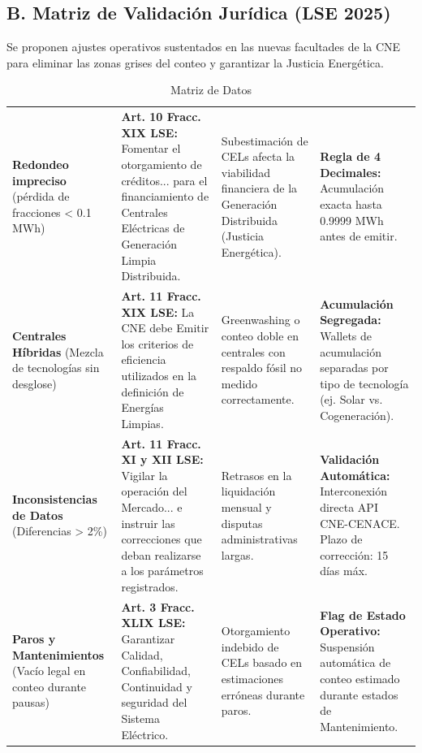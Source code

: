 \documentclass{cel}
\begin{document}
\subsection{B. Matriz de Validación Jurídica (LSE 2025)}
\nopagebreak

Se proponen ajustes operativos sustentados en las nuevas facultades de la CNE para eliminar las \textquotedbl{}zonas grises\textquotedbl{} del conteo y garantizar la Justicia Energética.


\vspace{0.3cm}
\begin{tabladoradoLargo}
\renewcommand{\tabularxcolumn}[1]{p{#1}}
\begin{xltabular}{\textwidth}{|X|X|X|X|}
\caption{Matriz de Datos} \\
\toprule
{}  &  &  &  \\
\midrule
\endhead
\textbf{Redondeo impreciso} (pérdida de fracciones \textless{} 0.1 MWh) & \textbf{Art. 10 Fracc. XIX LSE:} \textquotedbl{}Fomentar el otorgamiento de créditos... para el financiamiento de Centrales Eléctricas de Generación Limpia Distribuida\textquotedbl{}. & Subestimación de CELs afecta la viabilidad financiera de la Generación Distribuida (Justicia Energética). & \textbf{Regla de 4 Decimales:} Acumulación exacta hasta 0.9999 MWh antes de emitir. \\ \hline
\textbf{Centrales Híbridas} (Mezcla de tecnologías sin desglose) & \textbf{Art. 11 Fracc. XIX LSE:} La CNE debe \textquotedbl{}Emitir los criterios de eficiencia utilizados en la definición de Energías Limpias\textquotedbl{}. & \textquotedbl{}Greenwashing\textquotedbl{} o conteo doble en centrales con respaldo fósil no medido correctamente. & \textbf{Acumulación Segregada:} \textquotedbl{}Wallets\textquotedbl{} de acumulación separadas por tipo de tecnología (ej. Solar vs. Cogeneración). \\ \hline
\textbf{Inconsistencias de Datos} (Diferencias \textgreater{} 2\%) & \textbf{Art. 11 Fracc. XI y XII LSE:} \textquotedbl{}Vigilar la operación del Mercado... e instruir las correcciones que deban realizarse a los parámetros registrados\textquotedbl{}. & Retrasos en la liquidación mensual y disputas administrativas largas. & \textbf{Validación Automática:} Interconexión directa API CNE-CENACE. Plazo de corrección: 15 días máx. \\ \hline
\textbf{Paros y Mantenimientos} (Vacío legal en conteo durante pausas) & \textbf{Art. 3 Fracc. XLIX LSE:} Garantizar \textquotedbl{}Calidad, Confiabilidad, Continuidad y seguridad\textquotedbl{} del Sistema Eléctrico. & Otorgamiento indebido de CELs basado en estimaciones erróneas durante paros. & \textbf{Flag de Estado Operativo:} Suspensión automática de conteo estimado durante estados de \textquotedbl{}Mantenimiento\textquotedbl{}. \\ \hline
\bottomrule
\end{xltabular}
\end{tabladoradoLargo}
\end{document}
